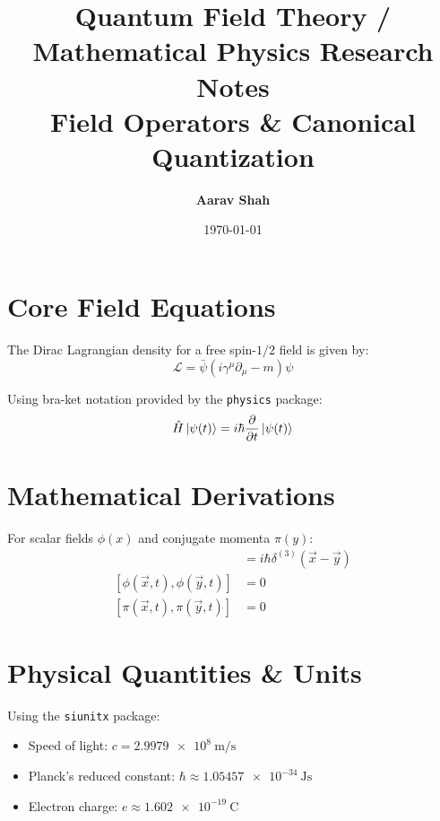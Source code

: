 \documentclass[11pt,a4paper]{article}
\title{\textbf{Quantum Field Theory / Mathematical Physics Research Notes}\\[0.3em] \large \textcolor{blue!80!black}{Field Operators \& Canonical Quantization}}
\author{\textbf{Aarav Shah}}
\date{\today}
\begin{document}
\maketitle

\section{Core Field Equations}
The Dirac Lagrangian density for a free spin-$1/2$ field is given by:
\begin{equation}
\mathcal{L} = \bar{\psi}(i\gamma^\mu \partial_\mu - m)\psi
\end{equation}

Using bra-ket notation provided by the \texttt{physics} package:
\begin{equation}
\hat{H} \ket{\psi(t)} = i\hbar \pdv{}{t} \ket{\psi(t)}
\end{equation}

\section{Mathematical Derivations}

\begin{derivationbox}
For scalar fields $\phi(x)$ and conjugate momenta $\pi(y)$:
\begin{align}
[\phi(\vec{x}, t), \pi(\vec{y}, t)] &= i\hbar \delta^{(3)}(\vec{x} - \vec{y}) \\
[\phi(\vec{x}, t), \phi(\vec{y}, t)] &= 0 \\
[\pi(\vec{x}, t), \pi(\vec{y}, t)] &= 0
\end{align}
\end{derivationbox}

\section{Physical Quantities \& Units}
Using the \texttt{siunitx} package:
\begin{itemize}
    \item Speed of light: $c = \SI{2.9979e8}{\meter\per\second}$
    \item Planck's reduced constant: $\hbar \approx \SI{1.05457e-34}{\joule\second}$
    \item Electron charge: $e \approx \SI{1.602e-19}{\coulomb}$
\end{itemize}
\end{document}
